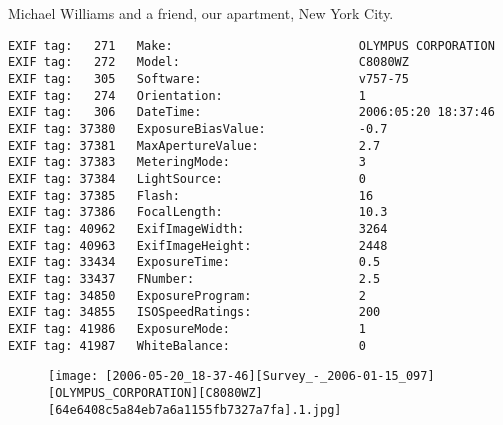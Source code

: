 \section{\protect{}}
\noindent Michael Williams and a friend, our apartment, New York City.
\noindent
\begin{lstlisting}
EXIF tag:   271   Make:                          OLYMPUS CORPORATION
EXIF tag:   272   Model:                         C8080WZ
EXIF tag:   305   Software:                      v757-75
EXIF tag:   274   Orientation:                   1
EXIF tag:   306   DateTime:                      2006:05:20 18:37:46
EXIF tag: 37380   ExposureBiasValue:             -0.7
EXIF tag: 37381   MaxApertureValue:              2.7
EXIF tag: 37383   MeteringMode:                  3
EXIF tag: 37384   LightSource:                   0
EXIF tag: 37385   Flash:                         16
EXIF tag: 37386   FocalLength:                   10.3
EXIF tag: 40962   ExifImageWidth:                3264
EXIF tag: 40963   ExifImageHeight:               2448
EXIF tag: 33434   ExposureTime:                  0.5
EXIF tag: 33437   FNumber:                       2.5
EXIF tag: 34850   ExposureProgram:               2
EXIF tag: 34855   ISOSpeedRatings:               200
EXIF tag: 41986   ExposureMode:                  1
EXIF tag: 41987   WhiteBalance:                  0

\end{lstlisting}
\clearpage
\begin{figure}
\raggedleft
\texttt{[image: [2006-05-20\_18-37-46][Survey\_-\_2006-01-15\_097][OLYMPUS\_CORPORATION][C8080WZ][64e6408c5a84eb7a6a1155fb7327a7fa].1.jpg]}
\end{figure}


\clearpage
